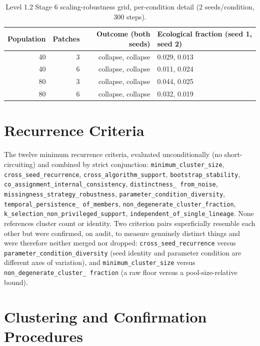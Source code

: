 \begin{table}[htbp]
\centering
\caption{Level 1.2 Stage 6 scaling-robustness grid, per-condition detail
(2 seeds/condition, 300 steps).}
\label{tab:stage6-detail}
\begin{tabular}{@{}rrrl@{}}
\toprule
\textbf{Population} & \textbf{Patches} & \textbf{Outcome (both seeds)} & \textbf{Ecological fraction (seed 1, seed 2)} \\
\midrule
40 & 3 & collapse, collapse & 0.029, 0.013 \\
40 & 6 & collapse, collapse & 0.011, 0.024 \\
80 & 3 & collapse, collapse & 0.044, 0.025 \\
80 & 6 & collapse, collapse & 0.032, 0.019 \\
\bottomrule
\end{tabular}
\end{table}

\clearpage
\section{Recurrence Criteria}
\label{sec:appendix-recurrence-criteria}

The twelve minimum recurrence criteria, evaluated unconditionally (no
short-circuiting) and combined by strict conjunction:
\texttt{minimum\_cluster\_size}, \texttt{cross\_seed\_recurrence},
\texttt{cross\_algorithm\_support}, \texttt{bootstrap\_stability},
\texttt{co\_assignment\_internal\_consistency}, \texttt{distinctness\_%
from\_noise}, \texttt{missingness\_strategy\_robustness},
\texttt{parameter\_condition\_diversity}, \texttt{temporal\_persistence\_%
of\_members}, \texttt{non\_degenerate\_cluster\_fraction},
\texttt{k\_selection\_non\_privileged\_support},
\texttt{independent\_of\_single\_lineage}. None references cluster count
or identity. Two criterion pairs superficially resemble each other but
were confirmed, on audit, to measure genuinely distinct things and were
therefore neither merged nor dropped: \texttt{cross\_seed\_recurrence}
versus \texttt{parameter\_condition\_diversity} (seed identity and
parameter condition are different axes of variation), and
\texttt{minimum\_cluster\_size} versus \texttt{non\_degenerate\_cluster\_%
fraction} (a raw floor versus a pool-size-relative bound).

\clearpage
\section{Clustering and Confirmation Procedures}
\label{sec:appendix-clustering-procedures}

